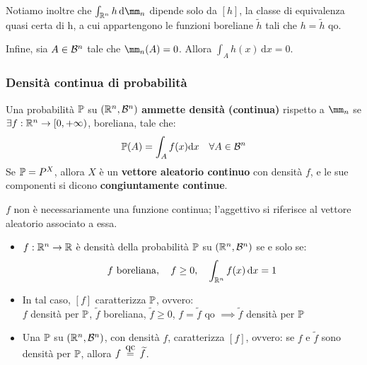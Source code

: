 Notiamo inoltre che $\int_{\RR^n} h \,\mathrm{d}\mm_n$ dipende solo da
$[h]$, la classe di equivalenza quasi certa di h, a cui appartengono le funzioni
boreliane $\widetilde{h}$ tali che $h = \widetilde{h}$ qo.

Infine, sia $A \in \mathcal B^n$ tale che $\mm_n(A) = 0$.
Allora $\int_{A} h(x) \, \mathrm{d}x = 0$.

\subsubsection{Densità continua di probabilità}

\begin{defn}
  Una probabilità $\mathbb P$ su $(\mathbb R^n, \mathcal B^n)$ \textbf{ammette densità (continua)}
  rispetto a $\mm_n$ se $\exists f: \mathbb R^n \to [0, +\infty)$, boreliana,
  tale che:
  $$\mathbb P(A) = \int_A f(x) \mathrm{d}x \quad \forall A \in \mathcal B^n$$
  Se $\mathbb P = P^X$, allora $X$ è un \textbf{vettore aleatorio continuo} con densità $f$,
  e le sue componenti si dicono \textbf{congiuntamente continue}.
\end{defn}

\begin{nb}
  $f$ non è necessariamente una funzione continua; l'aggettivo si riferisce al vettore aleatorio associato a essa.
\end{nb}

\medskip
\begin{teob}[\JPTh{12.1}]
  \Fixvmode
  \begin{itemize}
    \item $f: \mathbb R^n \to \mathbb R$ è densità della probabilità $\mathbb P$ su $(\mathbb R^n, \mathcal B^n)$ se e solo se:
      $$f \text{ boreliana}, \quad f \ge 0, \quad \int_{\mathbb R^n} f(x) \, \mathrm d x = 1$$
    \item In tal caso, $[f]$ caratterizza $\mathbb P$, ovvero: \\ $f$ densità per $\mathbb P$, $\widetilde{f}$ boreliana, $\widetilde{f} \ge 0$,
      $f = \widetilde{f}$ qo $\implies \widetilde{f}$ densità per $\mathbb P$
    \item Una $\mathbb P$ su $(\mathbb R^n, \mathcal B^n)$, con densità $f$, caratterizza $[f]$,
      ovvero: se $f$ e $\widetilde{f}$ sono densità per $\mathbb P$, allora $f \aceq \widetilde{f}$.
  \end{itemize}
\end{teob}


